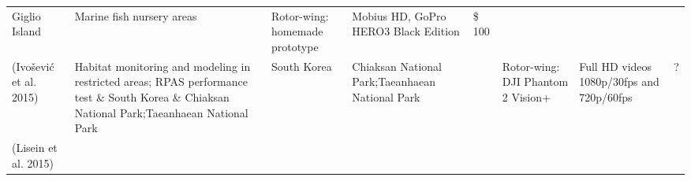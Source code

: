 \documentclass[]{interact}
\theoremstyle{plain}%
\theoremstyle{definition}
\theoremstyle{remark}
\begin{document}
\begin{longtable}[]{@{}llllllll@{}}
\begin{minipage}[t]{0.14\columnwidth}
Giglio Island\strut
\end{minipage} & \begin{minipage}[t]{0.10\columnwidth}\raggedright\strut
Marine fish nursery areas\strut
\end{minipage} & \begin{minipage}[t]{0.09\columnwidth}\raggedright\strut
Rotor-wing: homemade prototype\strut
\end{minipage} & \begin{minipage}[t]{0.11\columnwidth}\raggedright\strut
Mobius HD, GoPro HERO3 Black Edition\strut
\end{minipage} & \begin{minipage}[t]{0.01\columnwidth}\raggedright\strut
\$ 100\strut
\end{minipage}\tabularnewline
\begin{minipage}[t]{0.11\columnwidth}\raggedright\strut
(Ivošević et al. 2015)\strut
\end{minipage} & \begin{minipage}[t]{0.18\columnwidth}\raggedright\strut
Habitat monitoring and modeling in restricted areas; RPAS performance
test \& South Korea \& Chiaksan National Park;Taeanhaean National
Park\strut
\end{minipage} & \begin{minipage}[t]{0.03\columnwidth}\raggedright\strut
South Korea\strut
\end{minipage} & \begin{minipage}[t]{0.14\columnwidth}\raggedright\strut
Chiaksan National Park;Taeanhaean National Park\strut
\end{minipage} & \begin{minipage}[t]{0.10\columnwidth}\raggedright\strut
\strut
\end{minipage} & \begin{minipage}[t]{0.09\columnwidth}\raggedright\strut
Rotor-wing: DJI Phantom 2 Vision+\strut
\end{minipage} & \begin{minipage}[t]{0.11\columnwidth}\raggedright\strut
Full HD videos 1080p/30fps and 720p/60fps\strut
\end{minipage} & \begin{minipage}[t]{0.01\columnwidth}\raggedright\strut
?\strut
\end{minipage}\tabularnewline
\begin{minipage}[t]{0.11\columnwidth}\raggedright\strut
(Lisein et al. 2015)\strut
\end{minipage} & \begin{minipage}[t]{0.18\columnwidth}\raggedright\strut

\end{minipage}
\end{longtable}
\end{document}
